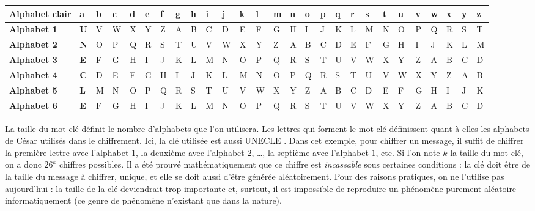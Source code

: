 \documentclass[a4paper, titlepage]{livret}
\begin{document}
\begin{center}
  \begin{tabular}{p{1.5cm}*{26}{p{0.1cm}}}
    \hline
    \textbf{Alphabet clair} & a & b & c & d & e & f & g & h & i & j & k & l & m & n & o & p & q & r & s & t & u & v & w & x & y & z \\
    \hline
    \textbf{Alphabet 1} & \textbf{U} & V & W & X & Y & Z & A & B & C & D & E & F & G & H & I & J & K & L & M & N & O & P & Q & R & S & T \\
    \hline
    \textbf{Alphabet 2} & \textbf{N} & O & P & Q & R & S & T & U & V & W & X & Y & Z & A & B & C & D & E & F & G & H & I & J & K & L & M \\
    \hline
    \textbf{Alphabet 3} & \textbf{E} & F & G & H & I & J & K & L & M & N & O & P & Q & R & S & T & U & V & W & X & Y & Z & A & B & C & D \\
    \hline
    \textbf{Alphabet 4} & \textbf{C} & D & E & F & G & H & I & J & K & L & M & N & O & P & Q & R & S & T & U & V & W & X & Y & Z & A & B \\
    \hline
    \textbf{Alphabet 5} & \textbf{L} & M & N & O & P & Q & R & S & T & U & V & W & X & Y & Z & A & B & C & D & E & F & G & H & I & J & K \\
    \hline
    \textbf{Alphabet 6} & \textbf{E} & F & G & H & I & J & K & L & M & N & O & P & Q & R & S & T & U & V & W & X & Y & Z & A & B & C & D \\
    \hline
  \end{tabular}
  \label{tab3} 
\end{center}

La taille du mot-clé définit le nombre d'alphabets que l'on utilisera.
Les lettres qui forment le mot-clé définissent quant à elles les alphabets de César utilisés dans le chiffrement.
Ici, la clé utilisée est aussi \og UNECLE \fg{}.
Dans cet exemple, pour chiffrer un message, il suffit de chiffrer la première lettre avec l'alphabet $1$, la deuxième avec l'alphabet $2$, …, la septième avec l'alphabet $1$, etc.
Si l'on note $k$ la taille du mot-clé, on a donc $26^k$ chiffres possibles.
Il a été prouvé mathématiquement que ce chiffre est \og \emph{incassable} \fg{} sous certaines conditions : la clé doit être de la taille du message à chiffrer, unique, et elle se doit aussi d'être générée aléatoirement.
Pour des raisons pratiques, on ne l'utilise pas aujourd'hui : la taille de la clé deviendrait trop importante et, surtout, il est impossible de reproduire un phénomène purement aléatoire informatiquement (ce genre de phénomène n'existant que dans la nature).
\newpage
\end{document}

